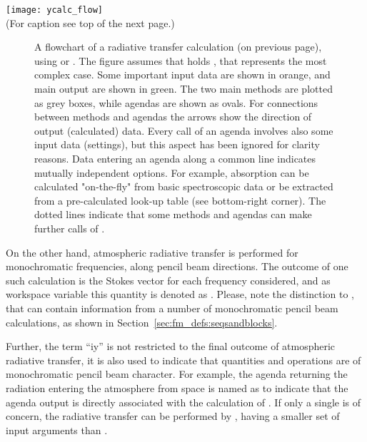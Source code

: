 \begin{figure*}[p]
 \begin{center}
  \texttt{[image: ycalc\_flow]}\\
  {\small (For caption see top of the next page.)}
 \end{center}
\end{figure*}

\begin{figure}[t]
  \caption{A flowchart of a radiative transfer calculation (on previous page),
    using  or . The figure assumes that
     holds , that
    represents the most complex case. Some important input data are shown in
    orange, and main output are shown in green. The two main methods are
    plotted as grey boxes, while agendas are shown as ovals. For
    connections between methods and agendas the arrows show the direction of
    output (calculated) data. Every call of an agenda involves also some input
    data (settings), but this aspect has been ignored for clarity reasons. Data
    entering an agenda along a common line indicates mutually independent
    options. For example, absorption can be calculated "on-the-fly" from basic
    spectroscopic data or be extracted from a pre-calculated look-up table (see
    bottom-right corner). The dotted lines indicate that some methods and
    agendas can make further calls of .}
  \label{fig:ycalc_flow}
\end{figure}

On the other hand, atmospheric radiative transfer is performed for
monochromatic frequencies, along pencil beam directions. The outcome of one
such calculation is the Stokes vector for each frequency considered, and as
workspace variable this quantity is denoted as . Please, note the
distinction to , that can contain information from a number of
monochromatic pencil beam calculations, as shown in
Section~\ref{sec:fm_defs:seqsandblocks}.

Further, the term ``iy'' is not restricted to the final outcome of atmospheric
radiative transfer, it is also used to indicate that quantities and operations
are of monochromatic pencil beam character. For example, the agenda returning
the radiation entering the atmosphere from space is named as
 to indicate that the agenda output is directly
associated with the calculation of . If only a single
 is of concern, the radiative transfer can be performed by
, having a smaller set of input arguments than
.

